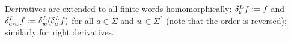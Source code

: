 %
%
%
%
%
%
Derivatives are extended to all finite words homomorphically:
$\delta^L_{\varepsilon} f := f$ and $\delta^L_{a \cdot w} f := \delta^L_{w} (\delta^L_{a} f)$
for all $a \in \Sigma$ and $w \in \Sigma^*$ (note that the order is reversed);
similarly for right derivatives.
